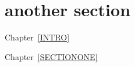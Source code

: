 \documentclass[class=../../utsthesis, crop=false]{standalone}
\begin{document}

\chapter{another section}

Chapter~\ref{INTRO}

Chapter~\ref{SECTIONONE}

\blindtext~\cite{Qb1}
\blindtext~\cite{Qb1}
\blindtext~\cite{Qb1}

\blindtext~\cite{Qb1}
\blindtext~\cite{Qb1}

\putbib
\clearpage
\end{document}
